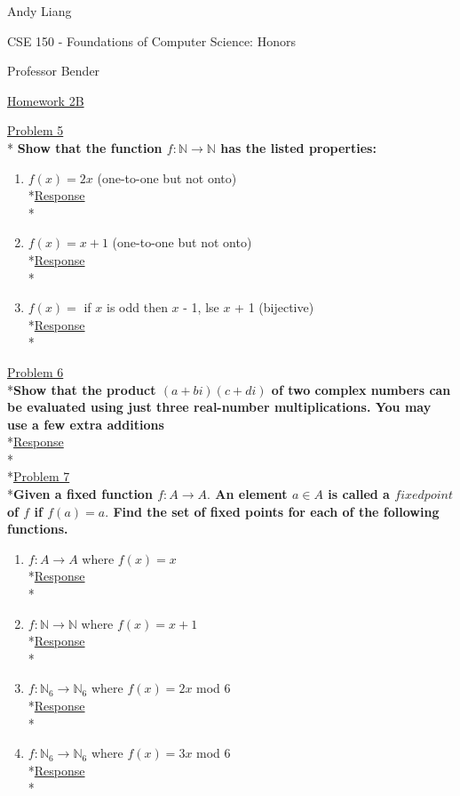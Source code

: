 \documentclass[12pt]{article}
\begin{document}
\begin{flushleft}
Andy Liang

CSE 150 - Foundations of Computer Science: Honors

Professor Bender
\end{flushleft}
\medskip
\centerline{\uline{Homework 2B}}
\bigskip\bigskip

\noindent
\uline{Problem 5}
\\*\textbf{ Show that the function $f: \mathbb{N} \rightarrow \mathbb{N}$ has the listed properties:}
\begin{enumerate}
\item $f(x) = 2x$ \qquad (one-to-one but not onto)
\smallskip
\\*\uline{Response}
\\*
\item $f(x) = x + 1$ \qquad (one-to-one but not onto)
\smallskip
\\*\uline{Response}
\\*
\item $f(x) =$ if $x$ is odd then $x$ - 1, lse $x$ + 1 \qquad (bijective)
\smallskip
\\*\uline{Response}
\\*
\end{enumerate}
\medskip
\uline{Problem 6}
\\*\textbf{Show that the product $(a + bi) (c + di)$ of two complex numbers can be evaluated using just three real-number multiplications. You may use a few extra additions}
\smallskip
\\*\uline{Response}
\\* 
\medskip
\\*\uline{Problem 7}
\\*\textbf{Given a fixed function $f: A \to A.$ An element $a \in A$ is called a $fixed point$ of $f$ if $f(a) = a.$ Find the set of fixed points for each of the following functions.}
\begin{enumerate}
\item $f: A \to A$ where $f(x) = x$
\smallskip
\\*\uline{Response}
\\*
\item $f: \mathbb{N} \to \mathbb{N}$ where $f(x) = x + 1$
\smallskip
\\*\uline{Response}
\\*
\item $f: \mathbb{N}_6 \to \mathbb{N}_6$ where $f(x) = 2x$ mod 6
\smallskip
\\*\uline{Response}
\\*
\item $f: \mathbb{N}_6 \to \mathbb{N}_6$ where $f(x) = 3x$ mod 6
\smallskip
\\*\uline{Response}
\\*
\end{enumerate}
\end{document}
